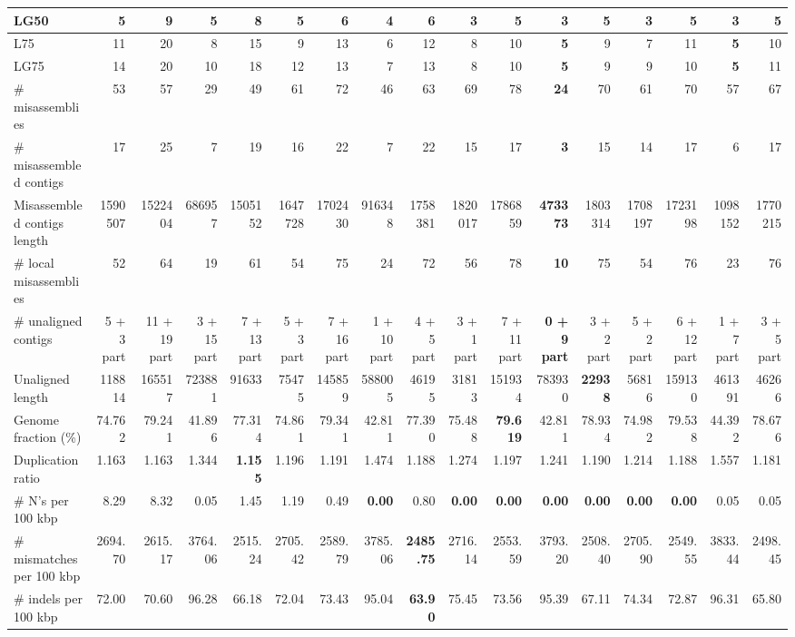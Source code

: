 \documentclass[12pt,a4paper]{article}
\begin{document}
\begin{table}[ht]
\begin{center}
\begin{tabular}{|l*{16}{|r}|}
LG50 & 5 & 9 & 5 & 8 & 5 & 6 & 4 & 6 & {\bf 3} & 5 & {\bf 3} & 5 & {\bf 3} & 5 & {\bf 3} & 5 \\ \hline
L75 & 11 & 20 & 8 & 15 & 9 & 13 & 6 & 12 & 8 & 10 & {\bf 5} & 9 & 7 & 11 & {\bf 5} & 10 \\ \hline
LG75 & 14 & 20 & 10 & 18 & 12 & 13 & 7 & 13 & 8 & 10 & {\bf 5} & 9 & 9 & 10 & {\bf 5} & 11 \\ \hline
\# misassemblies & 53 & 57 & 29 & 49 & 61 & 72 & 46 & 63 & 69 & 78 & {\bf 24} & 70 & 61 & 70 & 57 & 67 \\ \hline
\# misassembled contigs & 17 & 25 & 7 & 19 & 16 & 22 & 7 & 22 & 15 & 17 & {\bf 3} & 15 & 14 & 17 & 6 & 17 \\ \hline
Misassembled contigs length & 1590507 & 1522404 & 686957 & 1505152 & 1647728 & 1702430 & 916348 & 1758381 & 1820017 & 1786859 & {\bf 473373} & 1803314 & 1708197 & 1723198 & 1098152 & 1770215 \\ \hline
\# local misassemblies & 52 & 64 & 19 & 61 & 54 & 75 & 24 & 72 & 56 & 78 & {\bf 10} & 75 & 54 & 76 & 23 & 76 \\ \hline
\# unaligned contigs & 5 + 3 part & 11 + 19 part & 3 + 15 part & 7 + 13 part & 5 + 3 part & 7 + 16 part & 1 + 10 part & 4 + 5 part & 3 + 1 part & 7 + 11 part & {\bf 0 + 9 part} & 3 + 2 part & 5 + 2 part & 6 + 12 part & 1 + 7 part & 3 + 5 part \\ \hline
Unaligned length & 118814 & 165517 & 723881 & 91633 & 75475 & 145859 & 588005 & 46195 & 31813 & 151934 & 783930 & {\bf 22938} & 56816 & 159130 & 461391 & 46266 \\ \hline
Genome fraction (\%) & 74.762 & 79.241 & 41.896 & 77.314 & 74.861 & 79.341 & 42.811 & 77.390 & 75.488 & {\bf 79.619} & 42.811 & 78.934 & 74.982 & 79.538 & 44.392 & 78.676 \\ \hline
Duplication ratio & 1.163 & 1.163 & 1.344 & {\bf 1.155} & 1.196 & 1.191 & 1.474 & 1.188 & 1.274 & 1.197 & 1.241 & 1.190 & 1.214 & 1.188 & 1.557 & 1.181 \\ \hline
\# N's per 100 kbp & 8.29 & 8.32 & 0.05 & 1.45 & 1.19 & 0.49 & {\bf 0.00} & 0.80 & {\bf 0.00} & {\bf 0.00} & {\bf 0.00} & {\bf 0.00} & {\bf 0.00} & {\bf 0.00} & 0.05 & 0.05 \\ \hline
\# mismatches per 100 kbp & 2694.70 & 2615.17 & 3764.06 & 2515.24 & 2705.42 & 2589.79 & 3785.06 & {\bf 2485.75} & 2716.14 & 2553.59 & 3793.20 & 2508.40 & 2705.90 & 2549.55 & 3833.44 & 2498.45 \\ \hline
\# indels per 100 kbp & 72.00 & 70.60 & 96.28 & 66.18 & 72.04 & 73.43 & 95.04 & {\bf 63.90} & 75.45 & 73.56 & 95.39 & 67.11 & 74.34 & 72.87 & 96.31 & 65.80 \\ \hline

\end{tabular}
\end{center}
\end{table}
\end{document}
